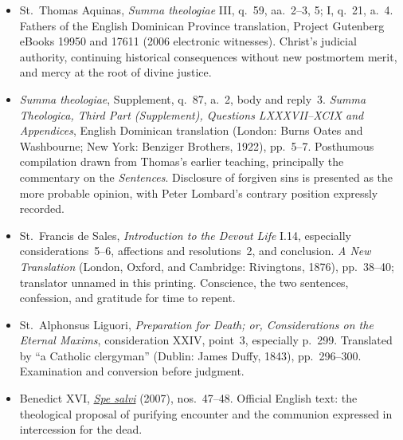 \begin{itemize}[leftmargin=1.25em,itemsep=0.2em]
\item St.~Thomas Aquinas, \emph{Summa theologiae} III, q.~59, aa.~2--3, 5; I, q.~21, a.~4. Fathers of the English Dominican Province translation, Project Gutenberg eBooks 19950 and 17611 (2006 electronic witnesses). Christ's judicial authority, continuing historical consequences without new postmortem merit, and mercy at the root of divine justice.
\item \emph{Summa theologiae}, Supplement, q.~87, a.~2, body and reply~3. \emph{Summa Theologica, Third Part (Supplement), Questions LXXXVII--XCIX and Appendices}, English Dominican translation (London: Burns Oates and Washbourne; New York: Benziger Brothers, 1922), pp.~5--7. Posthumous compilation drawn from Thomas's earlier teaching, principally the commentary on the \emph{Sentences}. Disclosure of forgiven sins is presented as the more probable opinion, with Peter Lombard's contrary position expressly recorded.
\item St.~Francis de Sales, \emph{Introduction to the Devout Life} I.14, especially considerations~5--6, affections and resolutions~2, and conclusion. \emph{A New Translation} (London, Oxford, and Cambridge: Rivingtons, 1876), pp.~38--40; translator unnamed in this printing. Conscience, the two sentences, confession, and gratitude for time to repent.
\item St.~Alphonsus Liguori, \emph{Preparation for Death; or, Considerations on the Eternal Maxims}, consideration XXIV, point~3, especially p.~299. Translated by ``a Catholic clergyman'' (Dublin: James Duffy, 1843), pp.~296--300. Examination and conversion before judgment.
\item Benedict XVI, \href{https://www.vatican.va/content/benedict-xvi/en/encyclicals/documents/hf_ben-xvi_enc_20071130_spe-salvi.html}{\emph{Spe salvi}} (2007), nos.~47--48. Official English text: the theological proposal of purifying encounter and the communion expressed in intercession for the dead.
\end{itemize}\endgroup
